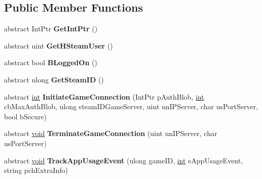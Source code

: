 \subsection*{Public Member Functions}
\begin{DoxyCompactItemize}
\item 
\hypertarget{classValve_1_1Steamworks_1_1ISteamUser_a03641087a3e87977882fff5e28ad488f}{}abstract Int\+Ptr {\bfseries Get\+Int\+Ptr} ()\label{classValve_1_1Steamworks_1_1ISteamUser_a03641087a3e87977882fff5e28ad488f}

\item 
\hypertarget{classValve_1_1Steamworks_1_1ISteamUser_a6fd30c4f036297a6070b7e210de236d7}{}abstract uint {\bfseries Get\+H\+Steam\+User} ()\label{classValve_1_1Steamworks_1_1ISteamUser_a6fd30c4f036297a6070b7e210de236d7}

\item 
\hypertarget{classValve_1_1Steamworks_1_1ISteamUser_a639e4ff98c9e00e663a45c23b7a1caa5}{}abstract bool {\bfseries B\+Logged\+On} ()\label{classValve_1_1Steamworks_1_1ISteamUser_a639e4ff98c9e00e663a45c23b7a1caa5}

\item 
\hypertarget{classValve_1_1Steamworks_1_1ISteamUser_a05257ca98d7900a7b6534649dec57b30}{}abstract ulong {\bfseries Get\+Steam\+I\+D} ()\label{classValve_1_1Steamworks_1_1ISteamUser_a05257ca98d7900a7b6534649dec57b30}

\item 
\hypertarget{classValve_1_1Steamworks_1_1ISteamUser_a6000129518ef947cf80f6f92b8e710b4}{}abstract \hyperlink{SDL__thread_8h_a6a64f9be4433e4de6e2f2f548cf3c08e}{int} {\bfseries Initiate\+Game\+Connection} (Int\+Ptr p\+Auth\+Blob, \hyperlink{SDL__thread_8h_a6a64f9be4433e4de6e2f2f548cf3c08e}{int} cb\+Max\+Auth\+Blob, ulong steam\+I\+D\+Game\+Server, uint un\+I\+P\+Server, char us\+Port\+Server, bool b\+Secure)\label{classValve_1_1Steamworks_1_1ISteamUser_a6000129518ef947cf80f6f92b8e710b4}

\item 
\hypertarget{classValve_1_1Steamworks_1_1ISteamUser_afe59b3cee1c0cbbd3e084f70e1e83d4e}{}abstract \hyperlink{SDL__audio_8h_a52835ae37c4bb905b903cbaf5d04b05f}{void} {\bfseries Terminate\+Game\+Connection} (uint un\+I\+P\+Server, char us\+Port\+Server)\label{classValve_1_1Steamworks_1_1ISteamUser_afe59b3cee1c0cbbd3e084f70e1e83d4e}

\item 
\hypertarget{classValve_1_1Steamworks_1_1ISteamUser_a224d42cb17ee31d1b7c7051c2b7ba9cc}{}abstract \hyperlink{SDL__audio_8h_a52835ae37c4bb905b903cbaf5d04b05f}{void} {\bfseries Track\+App\+Usage\+Event} (ulong game\+I\+D, \hyperlink{SDL__thread_8h_a6a64f9be4433e4de6e2f2f548cf3c08e}{int} e\+App\+Usage\+Event, string pch\+Extra\+Info)\label{classValve_1_1Steamworks_1_1ISteamUser_a224d42cb17ee31d1b7c7051c2b7ba9cc}


\end{DoxyCompactItemize}
